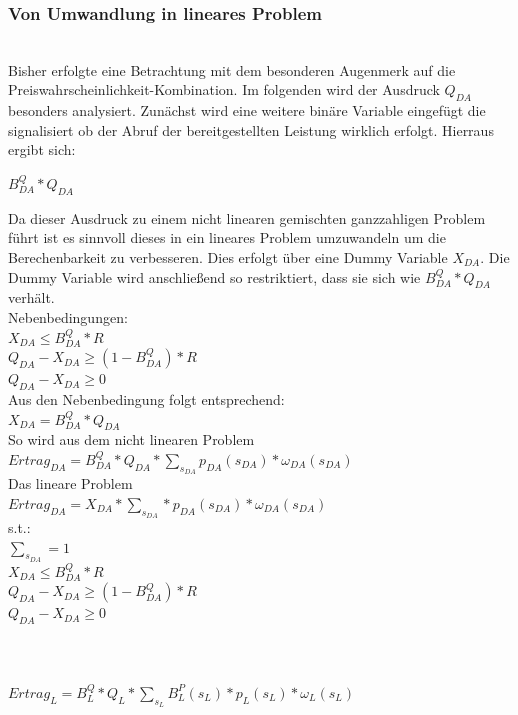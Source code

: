 \documentclass{article}
\begin{document}
\subsubsection{Von Umwandlung in lineares Problem}\\
Bisher erfolgte eine Betrachtung mit dem besonderen Augenmerk auf die Preiswahrscheinlichkeit-Kombination.
Im folgenden wird der Ausdruck $Q_{DA}$ besonders analysiert. Zunächst wird eine weitere binäre Variable eingefügt die signalisiert ob der Abruf der bereitgestellten Leistung wirklich erfolgt.
Hierraus ergibt sich:
\begin{center}
    $B^Q_{DA} * Q_{DA}$ 
\end{center}
Da dieser Ausdruck zu einem nicht linearen gemischten ganzzahligen Problem führt ist es sinnvoll dieses in ein lineares Problem umzuwandeln  um die Berechenbarkeit zu verbesseren.
Dies erfolgt über eine Dummy Variable $X_{DA}$. Die Dummy Variable wird anschließend so restriktiert, dass sie sich wie $B^Q_{DA} * Q_{DA}$ verhält.
\\
Nebenbedingungen:\\
$X_{DA} \leq B^Q_{DA} * R$\\
$Q_{DA} - X_{DA} \geq (1 - B^Q_{DA}) * R$\\
$Q_{DA} - X_{DA} \geq 0 $\\
Aus den Nebenbedingung folgt entsprechend:\\
$X_{DA} = B^Q_{DA} * Q_{DA}$\\

So wird aus dem nicht linearen Problem\\
$Ertrag_{DA} = B^Q_{DA} * Q_{DA} * \sum_{s_{DA}}  p_{DA}(s_{DA}) * \omega_{DA}(s_{DA})  $\\
Das lineare Problem\\
$Ertrag_{DA} = X_{DA} * \sum_{s_{DA}} * p_{DA}(s_{DA}) * \omega_{DA}(s_{DA})  $\\
s.t.:\\
$\sum_{s_{DA}} = 1$\\
$X_{DA} \leq B^Q_{DA} * R$\\
$Q_{DA} - X_{DA} \geq (1 - B^Q_{DA}) * R$\\
$Q_{DA} - X_{DA} \geq 0 $\\

\\
\\
\\
$Ertrag_{L} = B^Q_{L} * Q_{L} * \sum_{s_{L}} B^P_{L}(s_{L}) * p_{L}(s_{L}) * \omega_{L}(s_{L})  $\\
\end{document}
